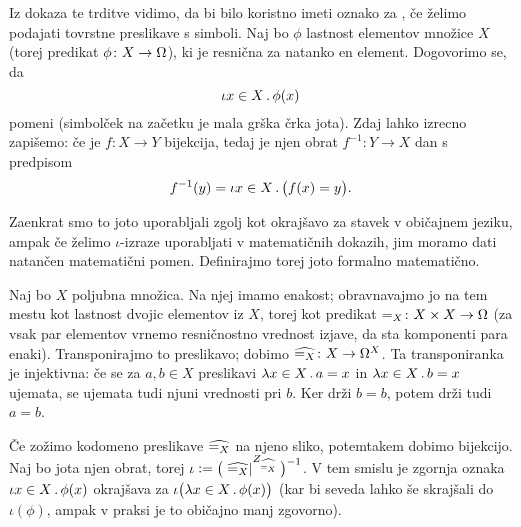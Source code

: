 Iz dokaza te trditve vidimo, da bi bilo koristno imeti oznako za , če želimo podajati tovrstne preslikave s simboli. Naj bo $\phi$ lastnost elementov množice $X$ (torej predikat $\phi\colon X \to \Omega$), ki je resnična za natanko en element. Dogovorimo se, da
\[\xthat{x}[X]{\phi(x)}\]
pomeni  (simbolček na začetku je mala grška črka jota). Zdaj lahko izrecno zapišemo: če je $f\colon X \to Y$ bijekcija, tedaj je njen obrat $f^{-1}\colon Y \to X$ dan s predpisom
\[f^{-1}(y) = \that[1]{x}[X]{f(x) = y}.\]


Zaenkrat smo to joto uporabljali zgolj kot okrajšavo za stavek v običajnem jeziku, ampak če želimo $\iota$-izraze uporabljati v matematičnih dokazih, jim moramo dati natančen matematični pomen. Definirajmo torej joto formalno matematično.

Naj bo $X$ poljubna množica. Na njej imamo enakost; obravnavajmo jo na tem mestu kot lastnost dvojic elementov iz $X$, torej kot predikat $=_X\colon X \times X \to \Omega$ (za vsak par elementov vrnemo resničnostno vrednost izjave, da sta komponenti para enaki). Transponirajmo to preslikavo; dobimo $\widehat{=_X}\colon X \to \Omega^X$. Ta transponiranka je injektivna: če se za $a, b \in X$ preslikavi $\xlam{x}[X]{a = x}$ in $\xlam{x}[X]{b = x}$ ujemata, se ujemata tudi njuni vrednosti pri $b$. Ker drži $b = b$, potem drži tudi $a = b$.

Če zožimo kodomeno preslikave $\widehat{=_X}$ na njeno sliko, potemtakem dobimo bijekcijo. Naj bo jota njen obrat, torej $\iota \mathrel{\mathop:}= \big(\left.{\widehat{=_X}}\right|^{Z_{\widehat{=_X}}}\big)^{-1}$. V tem smislu je zgornja oznaka $\xthat{x}[X]{\phi(x)}$ okrajšava za $\iota\big(\xlam{x}[X]{\phi(x)}\big)$ (kar bi seveda lahko še skrajšali do $\iota(\phi)$, ampak v praksi je to običajno manj zgovorno).


